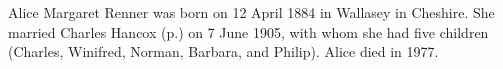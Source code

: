 
Alice Margaret Renner was born on 12 April 1884 in Wallasey in Cheshire.\cite{UKCensus1911_RG14_22074} She married Charles Hancox (p.\pageref{Charles_Edward_Hancox}) on 7 June 1905\cite{UKParishRegisters}, with whom she had five children (Charles, Winifred, Norman, Barbara, and Philip). Alice died in 1977.
